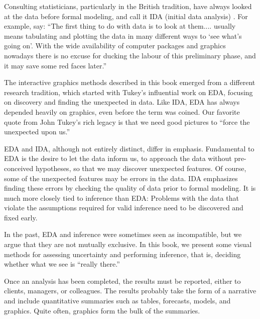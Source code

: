 \vspace{1em}

Consulting statisticians, particularly in the British tradition, have
always looked at the data before formal modeling, and call it IDA
(initial data analysis) \cite{Ch95}. For example, 
say: ``The first thing to do with data is to look at them.... usually
means tabulating and plotting the data in many different ways to `see
what's going on'. With the wide availability of computer packages and
graphics nowadays there is no excuse for ducking the labour of this
preliminary phase, and it may save some red faces later.''

The interactive graphics methods described in this book emerged from a
different research tradition, which started with Tukey's influential
work on EDA, focusing on discovery and finding the unexpected in
data. Like IDA, EDA has always depended heavily on graphics, even
before the term  was coined.  Our favorite
quote from John Tukey's rich legacy is that we need good pictures to
``force the unexpected upon us.''

EDA and IDA, although not entirely distinct, differ in
emphasis. Fundamental to EDA is the desire to let the data inform us,
to approach the data without pre-conceived hypotheses, so that we may
discover unexpected features. Of course, some of the unexpected
features may be errors in the data. IDA emphasizes finding these
errors by checking the quality of data prior to formal modeling. It
is much more closely tied to inference than EDA: Problems with the
data that violate the assumptions required for valid inference need to
be discovered and fixed early.

In the past, EDA and inference were sometimes seen as incompatible,
but we argue that they are not mutually exclusive.  In this book, we
present some visual methods for assessing uncertainty and performing
inference, that is, deciding whether what we see is ``really there.''

\vspace{1em}

Once an analysis has been completed, the results must be reported,
either to clients, managers, or colleagues.  The results probably take
the form of a narrative and include quantitative summaries such as
tables, forecasts, models, and graphics.  Quite often, graphics form
the bulk of the summaries.

